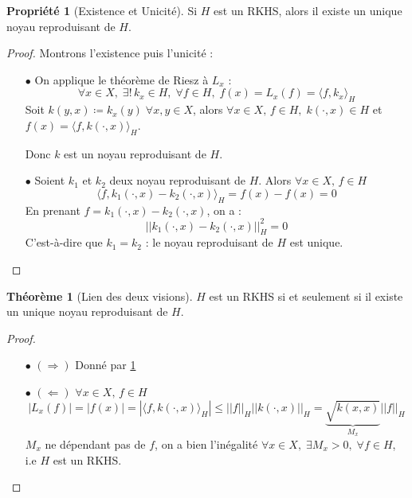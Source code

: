 \documentclass[a4paper, 11pt, french]{article}
\theoremstyle{definition}
\newtheorem{theorem}{Théorème}
\newtheorem{property}{Propriété}
\begin{document}
	\begin{property}[Existence et Unicité]
	\label{th:existunicity}
		Si $H$ est un RKHS, alors il existe un unique noyau reproduisant de $H$.
	\end{property}
	\begin{proof}
		Montrons l'existence puis l'unicité : \\
		\begin{itemize} 
			\item[$\bullet$]
			On applique le théorème de Riesz à $L_x$ :
			\[\forall x \in X, \; \exists ! \, k_x \in H, \; \forall f \in H, \; f(x) = L_x (f) = \langle f, k_x \rangle_H\]
			Soit $k(y, x) \coloneqq k_x(y) \; \forall x,y \in X$, alors $\forall x \in X, \, f \in H, \; k(\cdot, x) \in H$ et  $f(x) = \langle f, k(\cdot, x) \rangle_H$.
			
			Donc $k$ est un noyau reproduisant de $H$.
			
			\item[$\bullet$]
			Soient $k_1$ et $k_2$ deux noyau reproduisant de $H$. Alors $\forall x \in X, \, f \in H$
			\[\langle f, k_1(\cdot, x) - k_2(\cdot, x) \rangle_H = f(x) - f(x) = 0\]
			En prenant $f = k_1(\cdot, x) - k_2(\cdot, x)$, on a :
			\[\left|\left| k_1(\cdot, x) - k_2(\cdot, x) \right|\right|_H^2 = 0\]
			C'est-à-dire que $k_1 = k_2$ : le noyau reproduisant de $H$ est unique.
		\end{itemize}
	\end{proof}

	\begin{theorem}[Lien des deux visions]
		\label{th:link2visions}
		$H$ est un RKHS si et seulement si il existe un unique noyau reproduisant de $H$.
	\end{theorem}
	\begin{proof}
		\begin{itemize}
			\item[$\bullet$] $(\Rightarrow)$
				Donné par \ref{th:existunicity} 
			\item[$\bullet$] $(\Leftarrow)$ $\forall x \in X, \, f \in H$
				\[|L_x(f)| = |f(x)| = |\langle f, k(\cdot, x) \rangle_H| \leq ||f||_H ||k(\cdot,x)||_H = \underbrace{\sqrt{k(x,x)}}_{\text{$M_x$}} ||f||_H\]
				$M_x$ ne dépendant pas de $f$, on a bien l'inégalité $\forall x \in X, \;  \exists M_x > 0, \; \forall f \in H$, i.e $H$ est un RKHS.
		\end{itemize}
	\end{proof}
	
\end{document}
